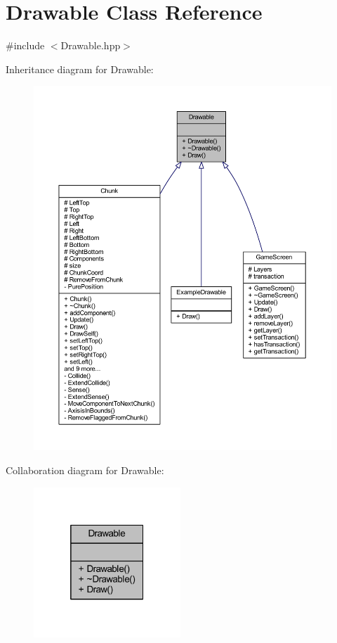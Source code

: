 \hypertarget{class_drawable}{\section{Drawable Class Reference}
\label{class_drawable}
}


{\ttfamily \#include $<$Drawable.\-hpp$>$}



Inheritance diagram for Drawable\-:
\nopagebreak
\begin{figure}[H]
\begin{center}
\leavevmode
\includegraphics[width=350pt]{class_drawable__inherit__graph}
\end{center}
\end{figure}


Collaboration diagram for Drawable\-:\nopagebreak
\begin{figure}[H]
\begin{center}
\leavevmode
\includegraphics[width=157pt]{class_drawable__coll__graph}
\end{center}
\end{figure}
